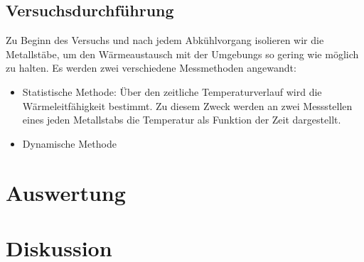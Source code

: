 \subsection{Versuchsdurchführung}
\label{sec:1}
Zu Beginn des Versuchs und nach jedem Abkühlvorgang isolieren wir die Metallstäbe,
um den Wärmeaustausch mit der Umgebungs so gering wie möglich zu halten. Es werden
zwei verschiedene Messmethoden angewandt:
\begin{itemize}
  \item Statistische Methode:
    Über den zeitliche Temperaturverlauf wird die Wärmeleitfähigkeit bestimmt.
    Zu diesem Zweck werden an zwei Messstellen eines jeden Metallstabs die Temperatur
    als Funktion der Zeit dargestellt.
  \item Dynamische Methode
\end{itemize}
\section{Auswertung}
\section{Diskussion}
\newpage
\nocite{*}
\printbibliography

